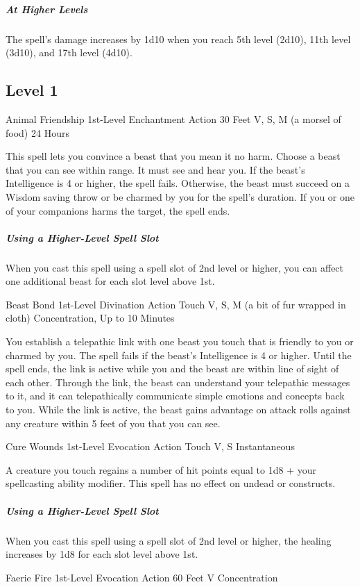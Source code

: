 \documentclass[letterpaper,openany,oneside,twocolumn]{book}
\begin{document}
\subparagraph*{At Higher Levels} The spell's damage increases by 1d10 when you reach 5th level (2d10), 11th level (3d10), and 17th level (4d10).

\subsection*{Level 1}

\DndSpellHeader
  {Animal Friendship}
  {1st-Level Enchantment}
  {Action}
  {30 Feet}
  {V, S, M (a morsel of food)}
  {24 Hours}

This spell lets you convince a beast that you mean it no harm. Choose a beast that you can see within range. It must see and hear you. If the beast's Intelligence is 4 or higher, the spell fails. Otherwise, the beast must succeed on a Wisdom saving throw or be charmed by you for the spell's duration. If you or one of your companions harms the target, the spell ends.

\subparagraph*{Using a Higher-Level Spell Slot} When you cast this spell using a spell slot of 2nd level or higher, you can affect one additional beast for each slot level above 1st.

\DndSpellHeader
  {Beast Bond}
  {1st-Level Divination}
  {Action}
  {Touch}
  {V, S, M (a bit of fur wrapped in cloth)}
  {Concentration, Up to 10 Minutes}

You establish a telepathic link with one beast you touch that is friendly to you or charmed by you. The spell fails if the beast's Intelligence is 4 or higher. Until the spell ends, the link is active while you and the beast are within line of sight of each other. Through the link, the beast can understand your telepathic messages to it, and it can telepathically communicate simple emotions and concepts back to you. While the link is active, the beast gains advantage on attack rolls against any creature within 5 feet of you that you can see.

\DndSpellHeader
  {Cure Wounds}
  {1st-Level Evocation}
  {Action}
  {Touch}
  {V, S}
  {Instantaneous}

A creature you touch regains a number of hit points equal to 1d8 + your spellcasting ability modifier. This spell has no effect on undead or constructs.

\subparagraph*{Using a Higher-Level Spell Slot} When you cast this spell using a spell slot of 2nd level or higher, the healing increases by 1d8 for each slot level above 1st.

\DndSpellHeader
  {Faerie Fire}
  {1st-Level Evocation}
  {Action}
  {60 Feet}
  {V}
  {Concentration}
\end{document}
